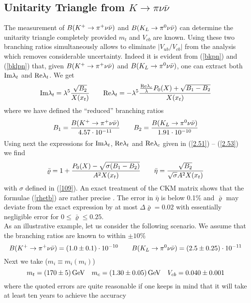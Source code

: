\subsection{Unitarity Triangle from $K\to\pi\nu\bar\nu$}
\label{sec:Kpnn:Triangle}
The measurement of $B(K^+ \to \pi^+\nu\bar\nu)$ and $B(K_L \to \pi^0\nu\bar\nu)$ can determine the
unitarity triangle completely provided $m_t$ and $V_{cb}$ are known.
Using these two branching ratios simultaneously allows to eliminate
$|V_{ub}/V_{cb}|$ from the analysis which removes considerable
uncertainty. Indeed it is evident from (\ref{bkpn}) and
(\ref{bklpn}) that, given $B(K^+ \to \pi^+\nu\bar\nu)$ and $B(K_L \to \pi^0\nu\bar\nu)$, one can extract
both ${\rm Im} \lambda_t$ and ${\rm Re} \lambda_t$. We get
\begin{equation}\label{imre}
{\rm Im} \lambda_t=\lambda^5{\sqrt{B_2}\over X(x_t)}\qquad
{\rm Re} \lambda_t=-\lambda^5{{{\rm Re} \lambda_c\over\lambda}P_0(X)+\sqrt{B_1-B_2}\over X(x_t)}
\end{equation}
where we have defined the ``reduced'' branching ratios
\begin{equation}\label{b1b2}
B_1={B(K^+ \to \pi^+\nu\bar\nu)\over 4.57\cdot 10^{-11}}\qquad
B_2={B(K_L \to \pi^0\nu\bar\nu)\over 1.91\cdot 10^{-10}}
\end{equation}
Using next the expressions for ${\rm Im} \lambda_t$, ${\rm Re} \lambda_t$ and ${\rm Re} \lambda_c$ given
in (\ref{2.51}) -- (\ref{2.53}) we find
\begin{equation}\label{rhetb}
\bar\varrho=1+{P_0(X)-\sqrt{\sigma(B_1-B_2)}\over A^2 X(x_t)}\qquad
\bar\eta={\sqrt{B_2}\over\sqrt{\sigma} A^2 X(x_t)}
\end{equation}
with $\sigma$ defined in (\ref{109}). An exact treatment of the CKM
matrix shows that the formulae (\ref{rhetb}) are rather precise
\cite{buchallaburas:94c}. The error in $\bar\eta$ is below 0.1\% and
$\bar\varrho$ may deviate from the exact expression by at most
$\Delta\bar\varrho=0.02$ with essentially negligible error for
$0\leq\bar\varrho\leq 0.25$.
\\
As an illustrative example, let us consider the following scenario.
We assume that the branching ratios are known to within $\pm 10\%$
\begin{equation}\label{bkpkl}
B(K^+ \to \pi^+\nu\bar\nu)=(1.0\pm 0.1)\cdot 10^{-10}\qquad
B(K_L \to \pi^0\nu\bar\nu)=(2.5\pm 0.25)\cdot 10^{-11}
\end{equation}
Next we take ($m_i\equiv m_i(m_i)$)
\begin{equation}\label{mtcv}
m_t=(170\pm 5)\, {\rm GeV}\quad m_c=(1.30\pm 0.05)\, {\rm GeV}\quad
V_{cb}=0.040\pm 0.001
\end{equation}
where the quoted errors are quite reasonable if one keeps in mind
that it will take at least ten years to achieve the accuracy
